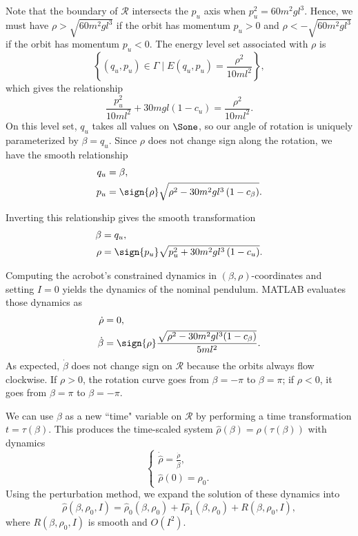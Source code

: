Note that the boundary of \(\mathcal{R}\) intersects the \(p_u\) axis when 
\(p_u^2 = 60m^2 g l^3\). 
Hence, we must have \(\rho > \sqrt{60 m^2 g l^3}\) if the
orbit has momentum \(p_u > 0\) 
and \(\rho < -\sqrt{60 m^2 g l^3}\) if the orbit has momentum \(p_u < 0\).
The energy level set associated with \(\rho\) is 
\[
    \left\{(q_u,p_u) \in \Gamma \mid E(q_u,p_u) = \frac{\rho^2}{10ml^2}\right\}
    ,
\]
which gives the relationship
\begin{equation}\label{eqn:rotation-pu2}
    \frac{p_u^2}{10m l^2} + 30mgl(1 - c_u) = \frac{\rho^2}{10 ml^2}
    .
\end{equation}
On this level set, \(q_u\) takes all values on \(\Sone\), so our angle of
rotation is uniquely parameterized by \(\beta = q_u\).
Since \(\rho\) does not change sign along the rotation, we have the smooth
relationship
\begin{align}\label{eqn:rotation-Tinv}
    q_u &= \beta
    , \\
    p_u &= \sign{\rho}\sqrt{\rho^2 - 30 m^2 g l^3\left(1 - c_\beta \right)}
    .
\end{align}

Inverting this relationship gives the smooth transformation
\begin{align}\label{eqn:rotation-T}
    \beta &= q_u
    , \\
    \rho &= \sign{p_u}\sqrt{p_u^2 + 30 m^2 g l^3 \left(1 - c_u \right)}
    .
\end{align}

Computing the acrobot's constrained dynamics in \((\beta,\rho)\)-coordinates and
setting \(I = 0\) yields the dynamics of the nominal pendulum.
MATLAB evaluates those dynamics as
\begin{align}\label{eqn:acrobot-rot-mu-dot-nom}
    \dot{\rho} &= 0
    , \\
    \label{eqn:acrobot-rot-alpha-dot-nom}
    \dot{\beta} &=  \sign{\rho} 
    \frac{\sqrt{\rho^2 - 30m^2gl^3(1 - c_\beta)}}{5ml^2}
    .
\end{align}
As expected, \(\dot{\beta}\) does not change sign on \(\mathcal{R}\) because the
orbits always flow clockwise.
If \(\rho > 0\), the rotation curve goes from \(\beta = -\pi\) to 
\(\beta = \pi\); 
if \(\rho < 0\), it goes from \(\beta = \pi\) to \(\beta = -\pi\).

We can use \(\beta\) as a new ``time" variable on \(\mathcal{R}\) 
by performing a time transformation \(t = \tau(\beta)\).
This produces the time-scaled system \(\hat{\rho}(\beta) = \rho(\tau(\beta))\)
with dynamics
\[
    \begin{cases}
        \dot{\hat{\rho}} = \frac{\dot{\rho}}{\dot{\beta}}
        , \\
        \hat{\rho}(0) = \rho_0
        .
    \end{cases}
\]
Using the perturbation method, we expand the solution of these dynamics into
\begin{equation}\label{eqn:acrobot-rhohat-approx}
    \hat{\rho}(\beta,\rho_0,I) = \hat{\rho}_0(\beta,\rho_0) +
    I\hat{\rho}_1(\beta,\rho_0) + R(\beta,\rho_0,I)
    ,
\end{equation}
where \(R(\beta,\rho_0,I)\) is smooth and \(O(I^2)\).

